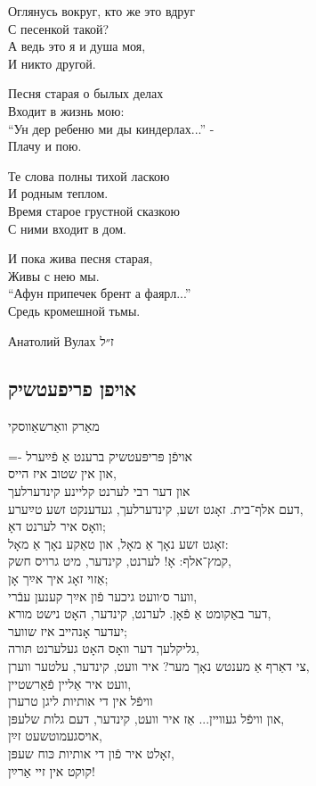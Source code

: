 \documentclass[11pt,twoside]{article}
\newcommand{\instruction}[1]{%
\ifhmode\else\noindent\fi%
{\plain\tiny{#1}}%
}
\begin{document}
{{\begin{russian}
Оглянусь вокруг, кто же это вдруг\\
С песенкой такой?\\
А ведь это я и душа моя,\\
И никто другой.

Песня старая о былых делах\\
Входит в жизнь мою:\\
“Ун дер ребеню ми ды киндерлах...” -\\
Плачу и пою.

Те слова полны тихой ласкою\\
И родным теплом.\\
Время старое грустной сказкою\\
С ними входит в дом.

И пока жива песня старая,\\
Живы с нею мы.\\
“Афун припечек брент а фаярл...”\\
Средь кромешной тьмы.

\hfill Анатолий Вулах {\prose ז״ל}
\end{russian}

\newpage

\subsection{אויפן פריפעטשיק}
\vspace{-\baselineskip}%
{\centering\instruction{מאַרק וואַרשאַווסקי}\par}
\vfill%
{\footnotesize%
\lineskiplimit=-\maxdimen%
אויפֿן פּריפּעטשיק ברענט אַ פֿײַערל\\
און אין שטוב איז הייס,\\
און דער רבי לערנט קליינע קינדערלעך\\
דעם אלף־בית.
\vfill%
זאָגט זשע, קינדערלעך, געדענקט זשע טײַערע,\\
וואָס איר לערנט דאָ;\\
זאָגט זשע נאָך אַ מאָל, און טאַקע נאָך אַ מאָל:\\
קמץ־אלף: אָ!
\vfill%
לערנט, קינדער, מיט גרויס חשק,\\
אַזוי זאָג איך אײַך אָן;\\
ווער ס׳וועט גיכער פֿון אײַך קענען עבֿרי,\\
דער באַקומט אַ פֿאָן.
\vfill%
לערנט, קינדער, האָט נישט מורא,\\
יעדער אָנהייב איז שווער;\\
גליקלעך דער וואָס האָט געלערנט תּורה,\\
צי דאַרף אַ מענטש נאָך מער?
\vfill%
איר וועט, קינדער, עלטער ווערן,\\
וועט איר אַליין פֿאַרשטיין,\\
וויפֿל אין די אותיות ליגן טרערן\\
און וויפֿל געוויין...
\vfill%
אַז איר וועט, קינדער, דעם גלות שלעפּן,\\
אויסגעמוטשעט זײַן,\\
זאָלט איר פֿון די אותיות כּוח שעפּן,\\
קוקט אין זיי אַרײַן!
}

}}
\end{document}
